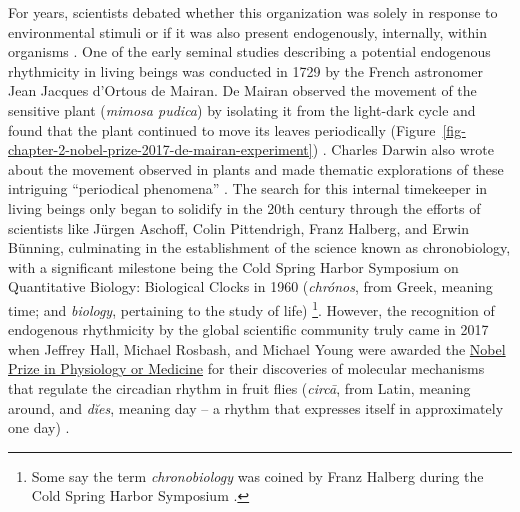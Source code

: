 \documentclass[
12pt,
openright,
oneside,
a4paper,
chapter=TITLE,
section=TITLE,
french,
spanish,
brazil,
english
]{abntex2}\usepackage{array}
\begin{document}
For years, scientists debated whether this organization was solely in
response to environmental stimuli or if it was also present
endogenously, internally, within organisms \autocite{rotenberg2003}. One
of the early seminal studies describing a potential endogenous
rhythmicity in living beings was conducted in 1729 by the French
astronomer Jean Jacques d'Ortous de Mairan. De Mairan observed the
movement of the sensitive plant (\emph{mimosa pudica}) by isolating it
from the light-dark cycle and found that the plant continued to move its
leaves periodically
(Figure~\ref{fig-chapter-2-nobel-prize-2017-de-mairan-experiment})
\autocite{demairan1729,rotenberg2003}. Charles Darwin also wrote about
the movement observed in plants and made thematic explorations of these
intriguing ``periodical phenomena'' \autocite{andrade2024}. The search
for this internal timekeeper in living beings only began to solidify in
the 20th century through the efforts of scientists like Jürgen Aschoff,
Colin Pittendrigh, Franz Halberg, and Erwin Bünning, culminating in the
establishment of the science known as chronobiology, with a significant
milestone being the Cold Spring Harbor Symposium on Quantitative
Biology: Biological Clocks in 1960 (\emph{chrónos}, from Greek, meaning
time; and \emph{biology}, pertaining to the study of life)
\autocite{rotenberg2003,coldspringharborlaboratory}\footnote{Some say
  the term \emph{chronobiology} was coined by Franz Halberg during the
  Cold Spring Harbor Symposium \autocite[21]{menna-barreto2023}.}.
However, the recognition of endogenous rhythmicity by the global
scientific community truly came in 2017 when Jeffrey Hall, Michael
Rosbash, and Michael Young were awarded the
\href{https://www.nobelprize.org/prizes/medicine/2017/press-release/}{Nobel
Prize in Physiology or Medicine} for their discoveries of molecular
mechanisms that regulate the circadian rhythm in fruit flies
(\emph{circā}, from Latin, meaning around, and \emph{dĭes}, meaning day
\autocite{latinitium} -- a rhythm that expresses itself in approximately
one day) \autocite{nobelprizeoutreachab}.
\end{document}
